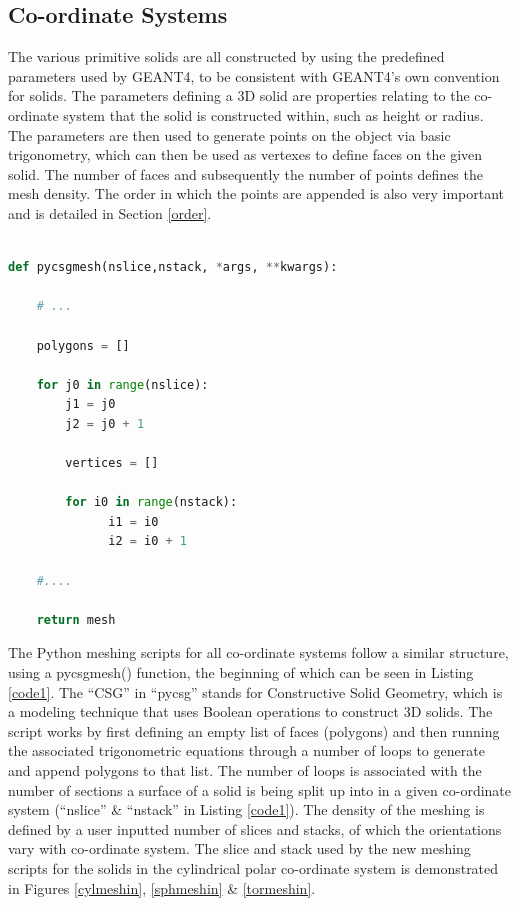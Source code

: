 \documentclass[12pt,a4paper]{article}
\begin{document}
\subsection{Co-ordinate Systems}
\label{cosy}
The various primitive solids are all constructed by using the predefined parameters used by GEANT4, to be consistent with GEANT4's own convention for solids. The parameters defining a 3D solid are properties relating to the co-ordinate system that the solid is constructed within, such as height or radius. The parameters are then used to generate points on the object via basic trigonometry, which can then be used as vertexes to define faces on the given solid. The number of faces and subsequently the number of points defines the mesh density. The order in which the points are appended is also very important and is detailed in Section \ref{order}.
\\\\

\begin{lstlisting}[language=Python, label=code1, caption=Basic Python script structure for new meshing of primitive solid in Pyg4ometry.]
def pycsgmesh(nslice,nstack, *args, **kwargs):

    # ... 
    
    polygons = []

    for j0 in range(nslice):
        j1 = j0
        j2 = j0 + 1
    
        vertices = []

        for i0 in range(nstack):
              i1 = i0
              i2 = i0 + 1     
              
    #....
    
    return mesh

\end{lstlisting}


\noindent The Python meshing scripts for all co-ordinate systems follow a similar structure, using a pycsgmesh() function, the beginning of which can be seen in Listing \ref{code1}. The ``CSG'' in ``pycsg'' stands for Constructive Solid Geometry, which is a  modeling technique that uses Boolean operations to construct 3D solids. The script works by  first defining an empty list of faces (polygons) and then running the associated trigonometric equations through a number of loops to generate and append polygons to that list. The number of loops is associated with the number of sections a surface of a solid is being split up into in a given co-ordinate system (``nslice'' \& ``nstack'' in Listing \ref{code1}). The density of the meshing is defined by a user inputted number of slices and stacks, of which the orientations vary with co-ordinate system. The slice and stack used by the new meshing scripts for the solids in the cylindrical polar co-ordinate system is demonstrated in Figures \ref{cylmeshin}, \ref{sphmeshin} \& \ref{tormeshin}.
\end{document}
